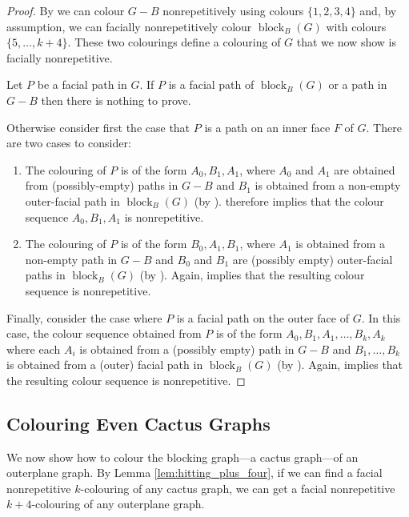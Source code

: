 \documentclass{patmorin}
\DeclareMathOperator{\block}{block}
\begin{document}
\begin{proof}
By  we can colour $G-B$ nonrepetitively using colours
$\{1,2,3,4\}$ and, by assumption, we can facially nonrepetitively colour
$\block_{B}(G)$ with colours $\{5,\dots, k+4\}$. These two colourings
define a colouring of $G$ that we now show is facially nonrepetitive.

Let $P$ be a facial path in $G$. If $P$ is a facial path of
$\block_{B}(G)$ or a path in $G-B$ then there is nothing to prove.

Otherwise consider first the case that $P$ is a path on an inner
face $F$ of $G$.   There are two cases to consider:
\begin{enumerate}
\item The colouring of $P$ is of the form $A_0,B_1,A_1$, where
  $A_0$ and $A_1$ are obtained from (possibly-empty) paths in $G-B$
  and $B_1$ is obtained from a non-empty outer-facial path in $\block_B(G)$
  (by ).   therefore implies that the
  colour sequence $A_0,B_1,A_1$ is nonrepetitive.

\item The colouring of $P$ is of the form $B_0,A_1,B_1$, where $A_1$
  is obtained from a non-empty path in $G-B$ and $B_0$ and $B_1$ are
  (possibly empty) outer-facial paths in $\block_B(G)$ (by ).
  Again,  implies that the resulting colour sequence
  is nonrepetitive.
\end{enumerate}

Finally, consider the case where $P$ is a facial path on the outer face
of $G$.  In this case, the colour sequence obtained from $P$ is of the
form $A_0,B_1,A_1,\ldots,B_k,A_k$ where each $A_i$ is obtained from a
(possibly empty) path in $G-B$ and $B_1,\ldots,B_k$ is obtained from
a (outer) facial path in $\block_B(G)$ (by ).  Again,
 implies that the resulting colour sequence is
nonrepetitive.
\end{proof}

\subsection{Colouring Even Cactus Graphs}

We now show how to colour the blocking graph---a cactus graph---of an
outerplane graph.  By Lemma \ref{lem:hitting_plus_four}, if we can find
a facial nonrepetitive $k$-colouring of any cactus graph, we can get a
facial nonrepetitive $k+4$-colouring of any outerplane graph.
\end{document}
